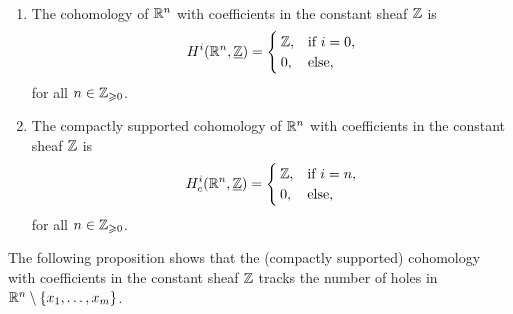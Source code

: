 \begin{prop}[name=Cohomology of Euclidean space]~
	\begin{enumerate}
    	\item The cohomology of $\mathbb{R}^n$ with coefficients in the constant sheaf $\mathbb{Z}$ is \[
        	\cohomology^i(\bb R^n, \underline{\bb Z}) = \begin{cases}
            	\bb Z, & \text{if } i = 0,\\
                0, &\text{else},
            \end{cases}
        \] for all $n \in \mathbb{Z}_{\geqslant 0}$.
        \item The compactly supported cohomology of $\mathbb{R}^n$ with coefficients in the constant sheaf $\mathbb{Z}$ is \[
        	\cohomology_c^i(\bb R^n, \underline{\bb Z}) = \begin{cases}
            	\bb Z, & \text{if } i = n,\\
                0, & \text{else},
            \end{cases}
        \] for all $n \in \mathbb{Z}_{\geqslant 0}$. 
    \end{enumerate}

\end{prop}

The following proposition shows that the (compactly supported) cohomology with coefficients in the constant sheaf $\mathbb{Z}$ tracks the number of holes in $\mathbb{R}^n\setminus \{x_1, \ldots, x_m\}$. 

